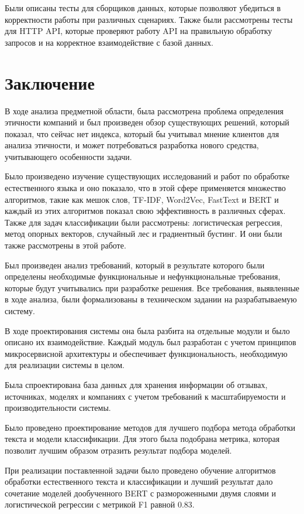 \documentclass[PI, VKR]{HSEUniversity}
\begin{document}
Были описаны тесты для сборщиков данных, которые позволяют убедиться в корректности работы при различных сценариях. Также были рассмотрены тесты для HTTP API, которые проверяют работу API на правильную обработку запросов и на корректное взаимодействие с базой данных.
\chapter*{Заключение}
\label{sec:orgcb805c2}
В ходе анализа предметной области, была рассмотрена проблема определения этичности компаний и был произведен обзор существующих решений, который показал, что сейчас нет индекса, который бы учитывал мнение клиентов для анализа этичности, и может потребоваться разработка нового средства, учитывающего особенности задачи.

Было произведено изучение существующих исследований и работ по обработке естественного языка и оно показало, что в этой сфере применяется множество алгоритмов, такие как мешок слов, TF-IDF, Word2Vec, FastText и BERT и каждый из этих алгоритмов показал свою эффективность в различных сферах. Также для задач классификации были рассмотрены: логистическая регрессия, метод опорных векторов, случайный лес и градиентный бустинг. И они были также рассмотрены в этой работе.

Был произведен анализ требований, который в результате которого были определены необходимые функциональные и нефункциональные требования, которые будут учитывались при разработке решения. Все требования, выявленные в ходе анализа, были формализованы в техническом задании на разрабатываемую систему.

В ходе проектирования системы она была разбита на отдельные модули и было описано их взаимодействие. Каждый модуль был разработан с учетом принципов микросервисной архитектуры и обеспечивает функциональность, необходимую для реализации системы в целом.

Была спроектирована база данных для хранения информации об отзывах, источниках, моделях и компаниях  с учетом требований к масштабируемости и производительности системы.

Было проведено проектирование методов для лучшего подбора метода обработки текста и модели классификации. Для этого была подобрана метрика, которая позволит лучшим образом отразить результат подбора моделей.

При реализации поставленной задачи было проведено обучение алгоритмов обработки естественного текста и классификации и лучший результат дало сочетание моделей дообученного BERT с размороженными двумя слоями и логистической регрессии с метрикой F1 равной 0.83.
\end{document}
